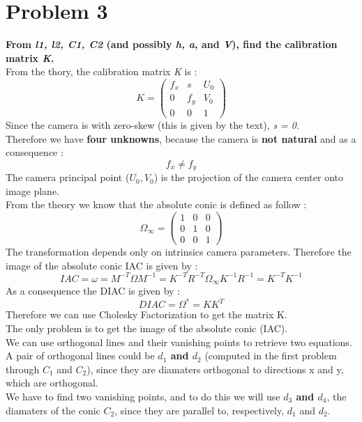 \documentclass[a4paper, 11pt, oneside, openright, english]{book}
\begin{document}
\section{Problem 3}
\textbf{From \textit{l1, l2, C1, C2} (and possibly \textit{h, a}, and \textit{V}), find the calibration matrix \textit{K}.}\\ 
From the thory, the calibration matrix \textit{K} is :
\[
    K = 
\begin{pmatrix}
    f_x & s   & U_0 \\
    0   & f_y & V_0 \\
    0   & 0   & 1
\end{pmatrix}    
\] 
Since the camera is with zero-skew (this is given by the text), \textit{s = 0}.\\
Therefore we have \textbf{four unknowns}, because the camera is \textbf{not natural} and as a consequence : \[ f_x \neq f_y\]
The camera principal point ($U_0, V_0$) is the projection of the camera center onto image plane.\\
From the theory we know that the absolute conic is defined as follow : 
\[
    \varOmega_\infty =  
\begin{pmatrix}
    1 & 0 & 0 \\
    0 & 1 & 0 \\ 
    0 & 0 & 1
\end{pmatrix}    
\]
The transformation depends only on intrinsics camera parameters. Therefore the image of the absolute conic IAC is given by : 
\begin{equation}
    IAC = \omega = M^{-T} \varOmega M^{-1} = K^{-T}R^{-T}\varOmega_\infty K^{-1}R^{-1} = K^{-T}K^{-1} \label{eq:omega}
\end{equation} 
As a consequence the DIAC is given by : 
\begin{equation}
    DIAC = \varOmega^{*} = KK^{T}
\end{equation}
Therefore we can use Cholesky Factorization to get the matrix K.\\
The only problem is to get the image of the absolute conic (IAC).\\
We can use orthogonal lines and their vanishing points to retrieve two equations.\\
A pair of orthogonal lines could be \textbf{$d_1$ and $d_2$} (computed in the first problem through $C_1$ and $C_2$), since they are diamaters orthogonal to directions x and y, which are orthogonal.\\
We have to find two vanishing points, and to do this we will use \textbf{$d_3$ and $d_4$}, the diamaters of the conic $C_2$, since they are parallel to, respectively, $d_1$ and $d_2$.
\end{document}
